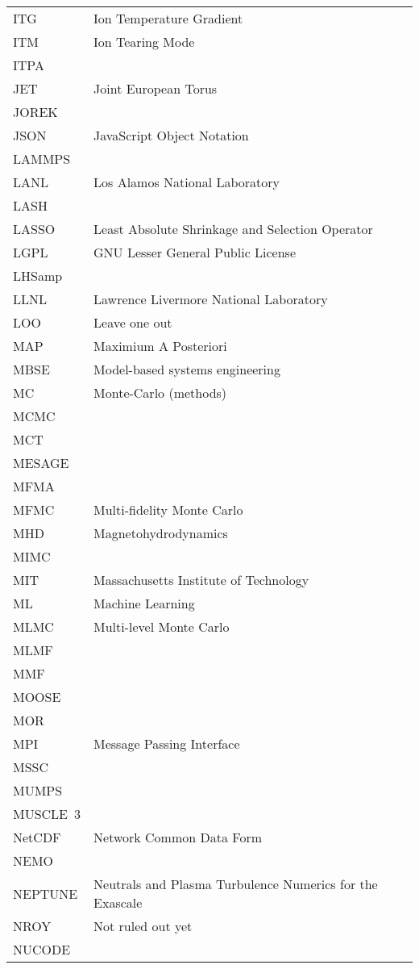 \begin{longtable}{|p{4.0cm}|p{12.0cm}|}
ITG & Ion Temperature Gradient \\
ITM & Ion Tearing Mode \\
ITPA & \\
JET & Joint European Torus \\
JOREK & \\
JSON & JavaScript Object Notation \\
LAMMPS & \\
LANL & Los Alamos National Laboratory \\
LASH & \\
LASSO & Least Absolute Shrinkage and Selection Operator \\
LGPL & GNU Lesser General Public License \\
LHSamp & \\
LLNL & Lawrence Livermore National Laboratory \\
LOO & Leave one out  \\
MAP & Maximium A Posteriori \\
MBSE & Model-based systems engineering \\
MC & Monte-Carlo (methods) \\
MCMC & \\
MCT & \\
MESAGE & \\
MFMA & \\
MFMC & Multi-fidelity Monte Carlo \\
MHD & Magnetohydrodynamics \\
MIMC & \\
MIT & Massachusetts Institute of Technology \\
ML & Machine Learning \\
MLMC & Multi-level Monte Carlo \\
MLMF & \\
MMF & \\
MOOSE & \\
MOR & \\
MPI & Message Passing Interface \\
MSSC & \\
MUMPS & \\
MUSCLE~3 & \\
NetCDF  &  Network Common Data Form \\
NEMO & \\
NEPTUNE & Neutrals and Plasma Turbulence Numerics for the Exascale \\
NROY & Not ruled out yet \\
NUCODE & \\

\end{longtable}
